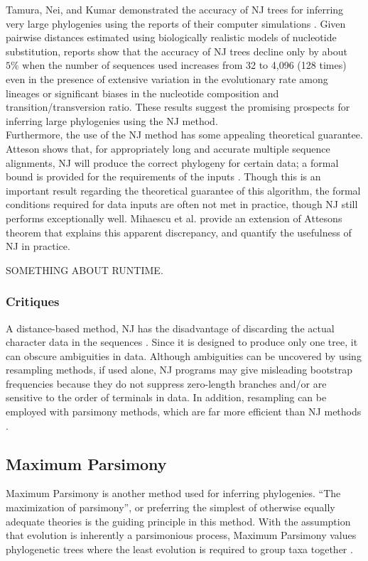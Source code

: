 \documentclass[10pt,twocolumn]{article}
\begin{document}
Tamura, Nei, and Kumar demonstrated the accuracy of NJ trees for inferring very large phylogenies using the reports of their computer simulations \cite{tamura2004prospects}. Given pairwise distances estimated using biologically realistic models of nucleotide substitution, reports show that the accuracy of NJ trees decline only by about $5\%$ when the number of sequences used increases from 32 to 4,096 (128 times) even in the presence of extensive variation in the evolutionary rate among lineages or significant biases in the nucleotide composition and transition/transversion ratio. These results suggest the promising prospects for inferring large phylogenies using the NJ method.\\

Furthermore, the use of the NJ method has some appealing theoretical guarantee. Atteson shows that, for appropriately long and accurate multiple sequence alignments, NJ will produce the correct phylogeny for certain data; a formal bound is provided for the requirements of the inputs \cite{atteson1999performance}. Though this is an important result regarding the theoretical guarantee of this algorithm, the formal conditions required for data inputs are often not met in practice, though NJ still performs exceptionally well. Mihaescu et al. \cite{mihaescu2009neighbor} provide an extension of Attesons theorem that explains this apparent discrepancy, and quantify the usefulness of NJ in practice.

SOMETHING ABOUT RUNTIME.

\subsubsection*{Critiques}
A distance-based method, NJ has the disadvantage of discarding the actual character data in the sequences \cite{brinkman2001phylogenetic}. Since it is designed to produce only one tree, it can obscure ambiguities in data. Although ambiguities can be uncovered by using resampling methods, if used alone, NJ programs may give misleading bootstrap frequencies because they do not suppress zero-length branches and/or are sensitive to the order of terminals in data. In addition, resampling can be employed with parsimony methods, which are far more efficient than NJ methods \cite{farris1996parsimony}.

\subsection*{Maximum Parsimony}
Maximum Parsimony is another method used for inferring phylogenies. ``The maximization of parsimony'', or preferring the simplest of otherwise equally adequate theories is the guiding principle in this method. With the assumption that evolution is inherently a parsimonious process, Maximum Parsimony values phylogenetic trees where the least evolution is required to group taxa together \cite{fitch1971toward}.
\end{document}

